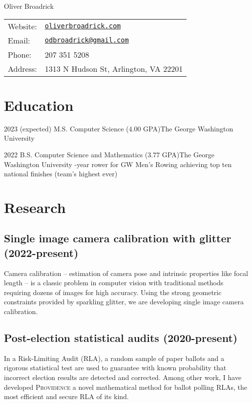 \documentclass[letterpaper]{article}
\newcommand{\Providence}{\textsc{Providence}\xspace}
\def\name{Oliver Broadrick}
\renewenvironment{itemize}{
  \begin{list}{}{
    \setlength{\leftmargin}{1.5em}
  }
}{
  \end{list}
}
\begin{document}
{\huge \name}

\vspace{0.25in}

\begin{minipage}{0.45\linewidth}
  \begin{tabular}{ll}
    Website: & \href{https://oliverbroadrick.com/}{\tt oliverbroadrick.com} \\
    Email: & \href{mailto:odbroadrick@gmail.com}{\tt odbroadrick@gmail.com} \\
    Phone: & 207 351 5208 \\
    Address: & 1313 N Hudson St, Arlington, VA 22201
  \end{tabular}
\end{minipage}


\section*{Education}

\begin{itemize}

\item 2023 (expected) M.S. Computer Science ($4.00$ GPA)\hfill The George Washington University
\item 2022 B.S. Computer Science and Mathematics ($3.77$ GPA)\hfill The George Washington University
    -year rower for GW Men's Rowing achieving top ten national finishes (team's highest ever)

\end{itemize}

\section*{Research}

\subsection*{Single image camera calibration with glitter (2022-present)}
Camera calibration -- estimation of camera pose and intrinsic properties like focal length -- is a classic problem in computer vision with traditional methods requiring dozens of images for high accuracy. Using the strong geometric constraints provided by sparkling glitter, we are developing single image camera calibration.

\subsection*{Post-election statistical audits (2020-present)}
In a Risk-Limiting Audit (RLA), a random sample of paper ballots and a rigorous statistical test are used to guarantee with known probability that incorrect election results are detected and corrected.
Among other work, I have developed \Providence a novel mathematical method for ballot polling RLAs, the most efficient and secure RLA of its kind.
\end{document}
